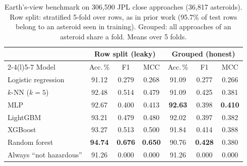 \begin{table}[t]
\centering
\footnotesize
\caption{Earth's-view benchmark on 306,590 JPL close approaches (36,817 asteroids). Row split: stratified 5-fold over rows, as in prior work (95.7\% of test rows belong to an asteroid seen in training). Grouped: all approaches of an asteroid share a fold. Means over 5 folds.}
\label{tab:earthview}
\setlength{\tabcolsep}{2.4pt}
\begin{tabular}{@{}lcccccc@{}}
\toprule
 & \multicolumn{3}{c}{Row split (leaky)} & \multicolumn{3}{c}{Grouped (honest)} \\
\cmidrule(lr){2-4}\cmidrule(l){5-7}
Model & Acc.\,\% & F1 & MCC & Acc.\,\% & F1 & MCC \\
\midrule
Logistic regression & 91.12 & 0.279 & 0.268 & 91.09 & 0.277 & 0.266 \\
$k$-NN ($k{=}5$) & 92.48 & 0.514 & 0.479 & 91.09 & 0.425 & 0.381 \\
MLP & 92.67 & 0.400 & 0.413 & \textbf{92.63} & 0.398 & \textbf{0.410} \\
LightGBM & 93.21 & 0.479 & 0.480 & 92.02 & 0.397 & 0.382 \\
XGBoost & 93.27 & 0.513 & 0.500 & 91.84 & 0.414 & 0.388 \\
Random forest & \textbf{94.74} & \textbf{0.676} & \textbf{0.650} & 90.76 & \textbf{0.428} & 0.380 \\
\midrule
Always ``not hazardous'' & 91.26 & 0.000 & 0.000 & 91.26 & 0.000 & 0.000 \\
\bottomrule
\end{tabular}
\end{table}
